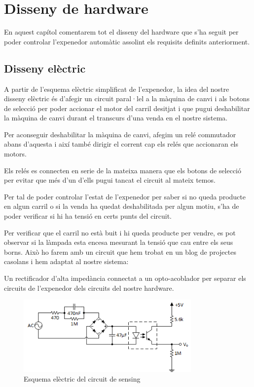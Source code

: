 \chapter{Disseny de hardware}\label{chapter:disseny de hardware}
En aquest capítol comentarem tot el disseny del hardware que s'ha seguit per poder controlar l'expenedor automàtic assolint els requisits definits anteriorment.

\section{Disseny elèctric}
A partir de l'esquema elèctric simplificat de l'expenedor, la idea del nostre disseny elèctric és d'afegir un circuit paral·lel a la màquina de canvi i als botons de selecció per poder accionar el motor del carril desitjat i que pugui deshabilitar la màquina de canvi durant el transcurs d'una venda en el nostre sistema. 

Per aconseguir deshabilitar la màquina de canvi, afegim un relé commutador abans d'aquesta i així també dirigir el corrent cap els relés que accionaran els motors.

Els relés es connecten en serie de la mateixa manera que els botons de selecció per evitar que més d'un d'ells pugui tancat el circuit al mateix temos.

Per tal de poder controlar l'estat de l'expenedor per saber si no queda producte en algun carril o si la venda ha quedat deshabilitada per algun motiu, s'ha de poder verificar si hi ha tensió en certs punts del circuit.

Per verificar que el carril no està buit i hi queda producte per vendre, es pot observar si la làmpada esta encesa mesurant la tensió que cau entre els seus borns. Això ho farem amb un circuit que hem trobat en un blog de projectes casolans i hem adaptat al nostre sistema:

Un rectificador d'alta impedància connectat a un opto-acoblador per separar els circuits de l'expenedor dels circuits del nostre hardware.

\begin{figure}[H]
\center
\includegraphics[width=0.8\textwidth]{images/sensing}
\caption{Esquema elèctric del circuit de sensing}
\label{fig:sensing_board}
\end{figure}

